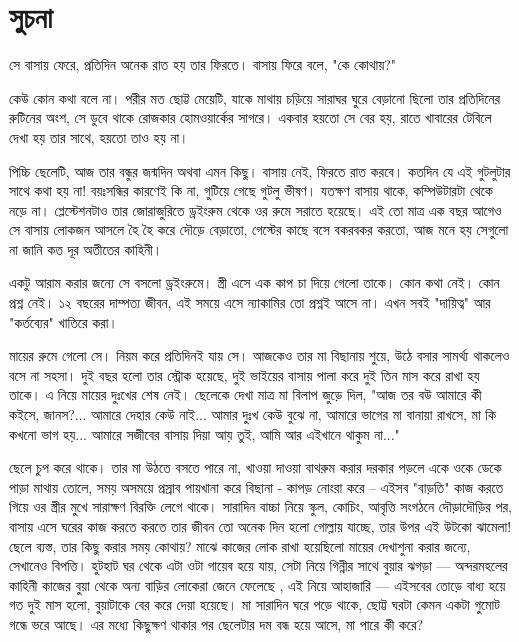 \section{সুচনা}
সে বাসায় ফেরে, প্রতিদিন অনেক রাত হয় তার ফিরতে। বাসায় ফিরে বলে, "কে কোথায়?"

কেউ কোন কথা বলে না। পরীর মত ছোট্ট মেয়েটি, যাকে মাথায় চড়িয়ে সারাঘর ঘুরে বেড়ানো ছিলো তার প্রতিদিনের রুটিনের অংশ, সে ডুবে থাকে রোজকার হোমওয়ার্কের সাগরে। একবার হয়তো সে বের হয়, রাতে খাবারের টেবিলে দেখা হয় তার সাথে, হয়তো তাও হয় না।

পিচ্চি ছেলেটি, আজ তার বন্ধুর জন্মদিন অথবা এমন কিছু। বাসায় নেই, ফিরতে রাত করবে। কতদিন যে এই গুটলুটার সাথে কথা হয় না! বয়ঃসন্ধির কারণেই কি না, গুটিয়ে গেছে গুটলু ভীষণ। যতক্ষণ বাসায় থাকে, কম্পিউটারটা থেকে নড়ে না। প্লেস্টেশনটাও তার জোরাজুরিতে ড্রইংরুম থেকে ওর রুমে সরাতে হয়েছে। এই তো মাত্র এক বছর আগেও সে বাসায় লোকজন আসলে হৈ হৈ করে দৌড়ে বেড়াতো, গেস্টের কাছে বসে বকরবকর করতো, আজ মনে হয় সেগুলো না জানি কত দূর অতীতের কাহিনী।

একটু আরাম করার জন্যে সে বসলো ড্রইংরুমে। স্ত্রী এসে এক কাপ চা দিয়ে গেলো তাকে। কোন কথা নেই। কোন প্রশ্ন নেই। ১২ বছরের দাম্পত্য জীবন, এই সময়ে এসে ন্যাকামির তো প্রশ্নই আসে না। এখন সবই "দায়িত্ব" আর "কর্তব্যের" খাতিরে করা।

মায়ের রুমে গেলো সে। নিয়ম করে প্রতিদিনই যায় সে। আজকেও তার মা বিছানায় শুয়ে, উঠে বসার সামর্থ্য থাকলেও বসে না সহসা। দুই বছর হলো তার স্ট্রোক হয়েছে, দুই ভাইয়ের বাসায় পালা করে দুই তিন মাস করে রাখা হয় তাকে। এ নিয়ে মায়ের দুঃখের শেষ নেই। ছেলেকে দেখা মাত্র মা বিলাপ জুড়ে দিল, "আজ তর বউ আমারে কী কইসে, জানস?... আমারে দেহার কেউ নাই... আমার দুঃখ কেউ বুঝে না, আমারে ভাগের মা বানায়া রাখসে, মা কি কখনো ভাগ হয়... আমারে সজীবের বাসায় দিয়া আয় তুই, আমি আর এইখানে থাকুম না..."

ছেলে চুপ করে থাকে। তার মা উঠতে বসতে পারে না, খাওয়া দাওয়া বাথরুম করার দরকার পড়লে একে ওকে ডেকে পাড়া মাথায় তোলে, সময় অসময়ে প্রস্রাব পায়খানা করে বিছানা - কাপড় নোংরা করে -- এইসব "বাড়তি" কাজ করতে গিয়ে ওর স্ত্রীর মুখে সারাক্ষণ বিরক্তি লেগে থাকে। সারাদিন বাচ্চা নিয়ে স্কুল, কোচিং, আবৃত্তি সংগঠনে দৌড়াদৌড়ির পর, বাসায় এসে ঘরের কাজ করতে করতে তার জীবন তো অনেক দিন হলো গোল্লায় যাচ্ছে, তার উপর এই উটকো ঝামেলা! ছেলে ব্যস্ত, তার কিছু করার সময় কোথায়? মাঝে কাজের লোক রাখা হয়েছিলো মায়ের দেখাশুনা করার জন্যে, সেখানেও বিপত্তি। হুটহাট ঘর থেকে এটা ওটা গায়েব হয়ে যায়, সেটা নিয়ে গিন্নীর সাথে বুয়ার ঝগড়া --- অন্দরমহলের কাহিনী কাজের বুয়া থেকে অন্য বাড়ির লোকেরা জেনে ফেলেছে , এই নিয়ে আহাজারি --- এইসবের তোড়ে বাধ্য হয়ে গত দুই মাস হলো, বুয়াটাকে বের করে দেয়া হয়েছে। মা সারাদিন ঘরে পড়ে থাকে, ছোট্ট ঘরটা কেমন একটা গুমোট গন্ধে ভরে আছে। এর মধ্যে কিছুক্ষণ থাকার পর ছেলেটার দম বন্ধ হয়ে আসে, মা পারে কী করে?

